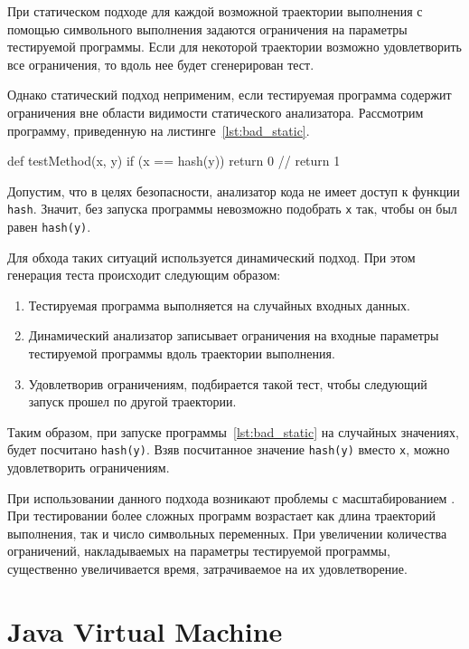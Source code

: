 При статическом подходе для каждой возможной траектории выполнения с помощью символьного выполнения задаются ограничения на параметры тестируемой программы. 
Если для некоторой траектории возможно удовлетворить все ограничения, то вдоль нее будет сгенерирован тест.

Однако статический подход неприменим, если тестируемая программа содержит ограничения вне области видимости статического анализатора. Рассмотрим программу, 
приведенную на листинге~\ref{lst:bad_static}.

\begin{snippet}[caption={Пример, на котором не применим статический подход}, label={lst:bad_static}]
  def testMethod(x, y) {
      if (x == hash(y)) {
          return 0	// %
      }
      return 1
  }
\end{snippet}

Допустим, что в целях безопасности, анализатор кода не имеет доступ к функции \texttt{hash}. Значит, без запуска программы невозможно подобрать \texttt{x} так, 
чтобы он был равен \texttt{hash(y)}.

Для обхода таких ситуаций используется динамический подход. При этом генерация теста происходит следующим образом:
\begin{enumerate}
 \item Тестируемая программа выполняется на случайных входных данных.
 \item Динамический анализатор записывает ограничения на входные параметры тестируемой программы вдоль траектории выполнения.
 \item Удовлетворив ограничениям, подбирается такой тест, чтобы следующий запуск прошел по другой траектории.
\end{enumerate}

Таким образом, при запуске программы~\ref{lst:bad_static} на случайных значениях, будет посчитано \texttt{hash(y)}. Взяв посчитанное значение \texttt{hash(y)} 
вместо \texttt{x}, можно удовлетворить ограничениям.

При использовании данного подхода возникают проблемы с масштабированием \cite{symbolic_limitations}. При тестировании более сложных программ возрастает как 
длина траекторий выполнения, так и число символьных переменных. При увеличении количества ограничений, накладываемых на параметры тестируемой программы, 
существенно увеличивается время, затрачиваемое на их удовлетворение.

\section{Java Virtual Machine}

